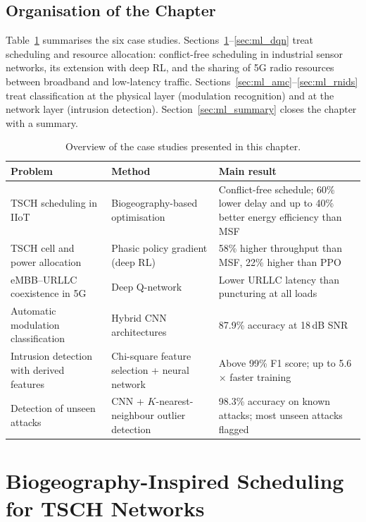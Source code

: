 \subsection{Organisation of the Chapter}
Table~\ref{tab:ml_overview} summarises the six case studies. Sections~\ref{sec:ml_bios}--\ref{sec:ml_dqn} treat scheduling and resource allocation: conflict-free scheduling in industrial sensor networks, its extension with deep RL, and the sharing of 5G radio resources between broadband and low-latency traffic. Sections~\ref{sec:ml_amc}--\ref{sec:ml_rnids} treat classification at the physical layer (modulation recognition) and at the network layer (intrusion detection). Section~\ref{sec:ml_summary} closes the chapter with a summary.

\begin{table}[H]
\centering
\caption{Overview of the case studies presented in this chapter.}
\label{tab:ml_overview}
\small
\begin{tabular}{@{}p{}p{}p{}@{}}
\toprule
\textbf{Problem} & \textbf{Method} & \textbf{Main result} \\
\midrule
TSCH scheduling in IIoT~\cite{ml_bios2021} & Biogeography-based optimisation & Conflict-free schedule; 60\% lower delay and up to 40\% better energy efficiency than MSF \\
TSCH cell and power allocation~\cite{ml_ppg2022} & Phasic policy gradient (deep RL) & 58\% higher throughput than MSF, 22\% higher than PPO \\
eMBB--URLLC coexistence in 5G~\cite{ml_dqn2025} & Deep Q-network & Lower URLLC latency than puncturing at all loads \\
Automatic modulation classification~\cite{ml_amc2024} & Hybrid CNN architectures & 87.9\% accuracy at 18\,dB SNR \\
Intrusion detection with derived features~\cite{ml_features2023} & Chi-square feature selection + neural network & Above 99\% F1 score; up to 5.6$\times$ faster training \\
Detection of unseen attacks~\cite{ml_rnids2022} & CNN + $K$-nearest-neighbour outlier detection & 98.3\% accuracy on known attacks; most unseen attacks flagged \\
\bottomrule
\end{tabular}
\end{table}

\section{Biogeography-Inspired Scheduling for TSCH Networks}
\label{sec:ml_bios}

